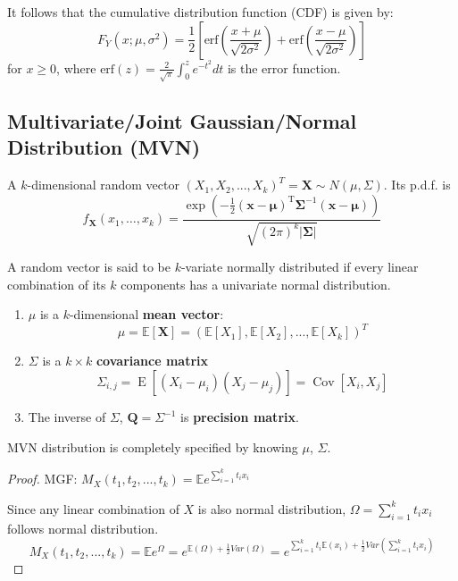 \documentclass[11pt]{elegantbook}
\begin{document}
It follows that the cumulative distribution function (CDF) is given by:
$${\displaystyle F_{Y}(x;\mu ,\sigma ^{2})={\frac {1}{2}}\left[{\mbox{erf}}\left({\frac {x+\mu }{\sqrt {2\sigma ^{2}}}}\right)+{\mbox{erf}}\left({\frac {x-\mu }{\sqrt {2\sigma ^{2}}}}\right)\right]}$$
for $x\geq 0$, where $\mbox{erf}(z)=\frac{2}{\sqrt{\pi}}\int_{0}^{z}e^{-t^{2}}dt$ is the error function.

\subsection{Multivariate/Joint Gaussian/Normal Distribution (MVN)}
A $k$-dimensional random vector $(X_1,X_2,...,X_k)^T=\mathbf{X}\sim N(\mu,\Sigma)$. Its p.d.f. is $${\displaystyle f_{\mathbf {X} }(x_{1},\ldots ,x_{k})={\frac {\exp \left(-{\frac {1}{2}}({\mathbf {x} }-{\boldsymbol {\mu }})^{\mathrm {T} }{\boldsymbol {\Sigma }}^{-1}({\mathbf {x} }-{\boldsymbol {\mu }})\right)}{\sqrt {(2\pi )^{k}|{\boldsymbol {\Sigma }}|}}}}$$

A random vector is said to be $k$-variate normally distributed if every linear combination of its $k$ components has a univariate normal distribution.
\begin{enumerate}[(1)]
    \item $\mu$ is a $k$-dimensional \textbf{mean vector}: $$\mu=\mathbb{E}[\mathbf{X}]=(\mathbb{E}[X_1],\mathbb{E}[X_2],...,\mathbb{E}[X_k])^T$$
    \item $\Sigma$ is a $k\times k$ \textbf{covariance matrix}$${\displaystyle \Sigma _{i,j}=\operatorname {E} [(X_{i}-\mu _{i})(X_{j}-\mu _{j})]=\operatorname {Cov} [X_{i},X_{j}]}$$
    \item The inverse of $\Sigma$, ${\boldsymbol {Q}}={\Sigma }^{-1}$ is \textbf{precision matrix}.
\end{enumerate}
\begin{theorem}
    MVN distribution is completely specified by knowing $\mu$, $\Sigma$.
\end{theorem}
\begin{proof}
MGF: $M_X(t_1,t_2,...,t_k)=\mathbb{E}e^{\sum_{i=1}^k t_ix_i}$

Since any linear combination of $X$ is also normal distribution, $\Omega=\sum_{i=1}^k t_ix_i$ follows normal distribution.
$$M_X(t_1,t_2,...,t_k)=\mathbb{E}e^\Omega=e^{\mathbb{E}(\Omega)+\frac{1}{2}Var(\Omega)}=e^{\sum_{i=1}^kt_i \mathbb{E}(x_i)+\frac{1}{2}Var(\sum_{i=1}^k t_ix_i)}$$
\end{proof}
\end{document}
